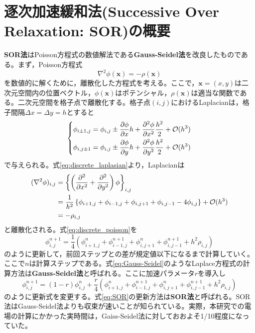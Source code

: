 \documentclass[autodetect-engine,dvi=dvipdfmx,a4paper,ja=standard,oneside,openany,11pt]{bxjsbook}
\begin{document}
\chapter{逐次加速緩和法(Successive Over Relaxation: SOR)の概要}
\label{sec:SOR}
\textbf{SOR法}はPoisson方程式の数値解法である\textbf{Gauss-Seidel法}を改良したものである。まず，Poisson方程式
\begin{equation}
  \nabla^2\phi(\bm{x})=-\rho(\bm{x})
  \label{eq:poisson}
\end{equation}
を数値的に解くために，離散化した方程式を考える。ここで，$\bm{x}=(x,y)$は二次元空間内の位置ベクトル，$\phi(\bm{x})$はポテンシャル，$\rho(\bm{x})$は適当な関数である。二次元空間を格子点で離散化する。格子点$(i,j)$におけるLaplacianは，格子間隔$\Delta x=\Delta y=h$とすると
\begin{equation}
  \left\{
  \begin{aligned}
    \phi_{i\pm1,j} & =\phi_{i,j}\pm \pdv{\phi}{x}h+\pdv[2]{\phi}{x}\frac{h^2}{2}+\mathcal{O}(h^3) \\
    \phi_{i,j\pm1} & =\phi_{i,j}\pm \pdv{\phi}{y}h+\pdv[2]{\phi}{y}\frac{h^2}{2}+\mathcal{O}(h^3)
  \end{aligned}
  \right.
  \label{eq:discrete_laplasian}
\end{equation}
で与えられる。式\eqref{eq:discrete_laplasian}より，Laplacianは
\begin{equation}
  \begin{split}
    (\nabla^2\phi)_{i,j} & =\left\{\left(\pdv*[2]{}{x}+\pdv*[2]{}{y}\right)\phi\right\}_{i,j}                                            \\
                         & =\frac{1}{h^2}\left\{\phi_{i+1,j}+\phi_{i-1,j}+\phi_{i,j+1}+\phi_{i,j-1}-4\phi_{i,j}\right\}+\mathcal{O}(h^3) \\
                         & =-\rho_{i,j}
  \end{split}
  \label{eq:discrete_poisson}
\end{equation}
と離散化される。式\eqref{eq:discrete_poisson}を
\begin{equation}
  \phi_{i,j}^{n+1}=\frac{1}{4}\left(\phi_{i+1,j}^{n}+\phi_{i-1,j}^{n+1}+\phi_{i,j+1}^{n}+\phi_{i,j-1}^{n+1}+h^2\rho_{i,j}\right)
  \label{eq:Gauss-Seidel}
\end{equation}
のように更新して，前回ステップとの差が規定値以下になるまで計算していく。ここで$n$は計算ステップである。式\ref{eq:Gauss-Seidel}のようなLaplace方程式の計算方法は\textbf{Gauss-Seidel法}と呼ばれる。ここに加速パラメータ$r$を導入し
\begin{equation}
  \phi_{i,j}^{n+1}=(1-r)\phi_{i,j}^{n}+\frac{r}{4}\left(\phi_{i+1,j}^{n}+\phi_{i-1,j}^{n+1}+\phi_{i,j+1}^{n}+\phi_{i,j-1}^{n+1}+h^2\rho_{i,j}\right)
  \label{eq:SOR}
\end{equation}
のように更新式を変更する。式\ref{eq:SOR}の更新方法は\textbf{SOR法}と呼ばれる。SOR法はGauss-Seidel法よりも収束が速いことが知られている。実際，本研究での電場の計算にかかった実時間は，Gaiss-Seidel法に対しておおよそ1/10程度になっていた。
\end{document}

